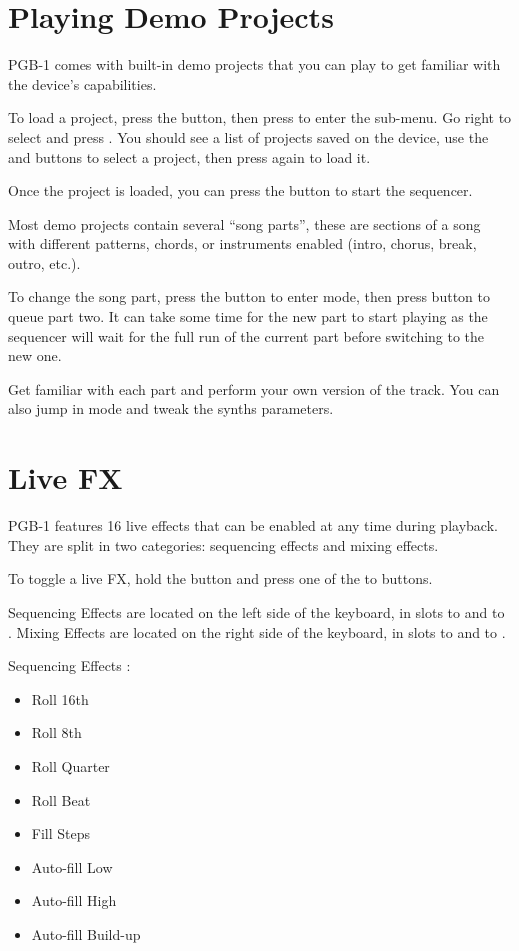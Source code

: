 \documentclass[8pt]{extarticle}
\def\device{PGB-1 }
\begin{document}
\begin{multicols*}{3}
\section{Playing Demo Projects} 

\device comes with built-in demo projects that you can play to get familiar with the device’s capabilities.

To load a project, press the  button, then press  to enter the  sub-menu. Go right to select  and press . You should see a list of projects saved on the device, use the  and  buttons to select a project, then press  again to load it.

Once the project is loaded, you can press the  button to start the sequencer.

Most demo projects contain several “song parts”, these are sections of a song with different patterns, chords, or instruments enabled (intro, chorus, break, outro, etc.).

To change the song part, press the  button to enter  mode, then press button  to queue part two. It can take some time for the new part to start playing as the sequencer will wait for the full run of the current part before switching to the new one.

Get familiar with each part and perform your own version of the track. You can also jump in  mode and tweak the synths parameters.

\section{Live FX}

\device features 16 live effects that can be enabled at any time during playback. They are split in two categories: sequencing effects and mixing effects.

To toggle a live FX, hold the  button and press one of the  to  buttons.

Sequencing Effects are located on the left side of the keyboard, in slots  to  and  to .
Mixing Effects are located on the right side of the keyboard, in slots  to  and  to .

\begin{multicols}{2}
    Sequencing Effects :
    \begin{itemize}
    \item[\kbd{1}] Roll 16th
    \item[\kbd{2}] Roll 8th
    \item[\kbd{3}] Roll Quarter
    \item[\kbd{4}] Roll Beat
    \item[\kbd{9}] Fill Steps
    \item[\kbd{10}] Auto-fill Low
    \item[\kbd{11}] Auto-fill High
    \item[\kbd{12}] Auto-fill Build-up
    \end{itemize}
    

\end{multicols}
\end{multicols*}
\end{document}

